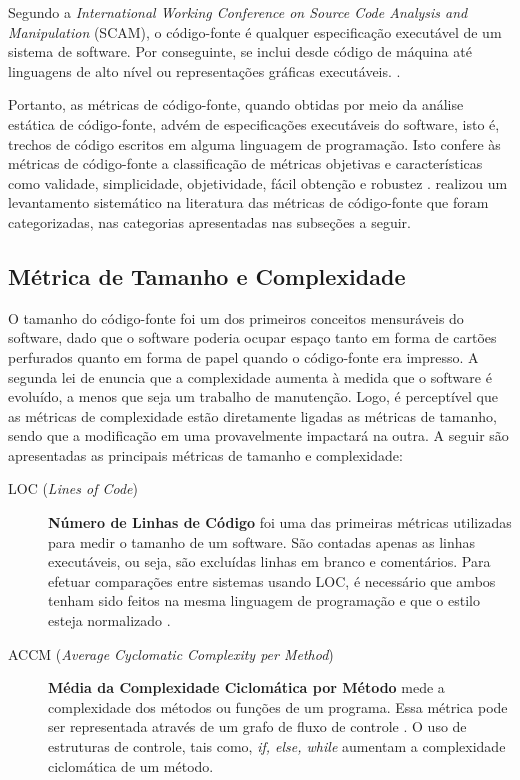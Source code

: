 Segundo a \textit{International Working Conference on Source Code Analysis and 
Manipulation} (SCAM), o código-fonte é qualquer especificação executável 
de um sistema de software. Por conseguinte, se inclui desde código de máquina 
até linguagens de alto nível ou representações gráficas executáveis. 
\cite{harman2010source}. 


Portanto, as métricas de código-fonte, quando obtidas por meio da análise estática de código-fonte, advém de especificações executáveis do software, isto é, trechos de código escritos em alguma linguagem de programação. Isto confere às métricas de código-fonte a classificação de métricas objetivas e características como validade, simplicidade, objetividade, fácil obtenção e robustez \cite{Mills:1999}.  realizou um levantamento sistemático na literatura das métricas de código-fonte que foram categorizadas, nas categorias apresentadas nas subseções a seguir. 


\subsection{Métrica de Tamanho e Complexidade}

\label{métricas tamanho e complexidade} 

O tamanho do código-fonte foi um dos primeiros conceitos mensuráveis do 
software, dado que o software poderia ocupar espaço tanto em forma de cartões 
perfurados quanto em forma de papel quando o código-fonte era impresso. 
A segunda lei de  enuncia que a complexidade aumenta à 
medida que o software é evoluído, a menos que seja um trabalho de manutenção. 
Logo, é perceptível que as métricas de complexidade estão diretamente ligadas as 
métricas de tamanho, sendo que a modificação em uma provavelmente impactará na 
outra. A seguir são apresentadas as principais métricas de tamanho e 
complexidade:


\begin{description}

	\item[LOC (\textit{Lines of Code})] \textbf{Número de Linhas de Código} 
	foi uma das primeiras métricas utilizadas para medir o tamanho de um 
	software. São contadas apenas as linhas executáveis, ou seja, são excluídas 
	linhas em branco e comentários. Para efetuar comparações entre sistemas 
	usando LOC, é necessário que ambos tenham sido feitos na mesma linguagem de 
	programação e que o estilo esteja normalizado \cite{Jones91}.
	
	\item[ACCM (\textit{Average Cyclomatic Complexity per Method})] \textbf{
	Média da Complexidade Ciclomática por Método} mede a complexidade dos 
	métodos ou funções de um programa. Essa métrica pode ser representada 
	através de um grafo de fluxo de controle \cite{McCabe76}. O uso de 
	estruturas de controle, tais como, \textit{if, else, while} aumentam a 
	complexidade ciclomática de um método.

\end{description}




